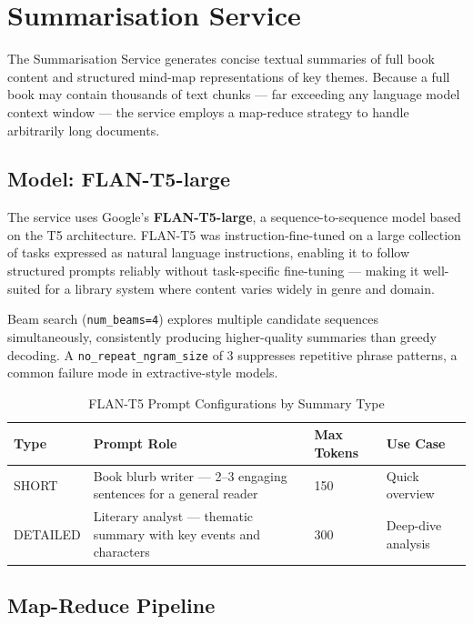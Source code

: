 \section{Summarisation Service}
\label{sec:summarisation}

The Summarisation Service generates concise textual summaries of full book
content and structured mind-map representations of key themes. Because a full
book may contain thousands of text chunks --- far exceeding any language model
context window --- the service employs a map-reduce strategy to handle
arbitrarily long documents.

\subsection{Model: FLAN-T5-large}

The service uses Google's \textbf{FLAN-T5-large}, a sequence-to-sequence model
based on the T5 architecture. FLAN-T5 was instruction-fine-tuned on a large
collection of tasks expressed as natural language instructions, enabling it to
follow structured prompts reliably without task-specific fine-tuning --- making
it well-suited for a library system where content varies widely in genre and
domain.

Beam search (\texttt{num\_beams=4}) explores multiple candidate sequences
simultaneously, consistently producing higher-quality summaries than greedy
decoding. A \texttt{no\_repeat\_ngram\_size} of 3 suppresses repetitive phrase
patterns, a common failure mode in extractive-style models.

\begin{table}[H]
\centering
\caption{FLAN-T5 Prompt Configurations by Summary Type}
\label{tab:summarytypes}
\begin{tabularx}{\textwidth}{|l|X|l|l|}
\hline
\textbf{Type} & \textbf{Prompt Role} & \textbf{Max Tokens} & \textbf{Use Case} \\
\hline
SHORT    & Book blurb writer --- 2--3 engaging sentences for a general reader & 150 & Quick overview \\
\hline
DETAILED & Literary analyst --- thematic summary with key events and characters & 300 & Deep-dive analysis \\
\hline
\end{tabularx}
\end{table}

\subsection{Map-Reduce Pipeline}

